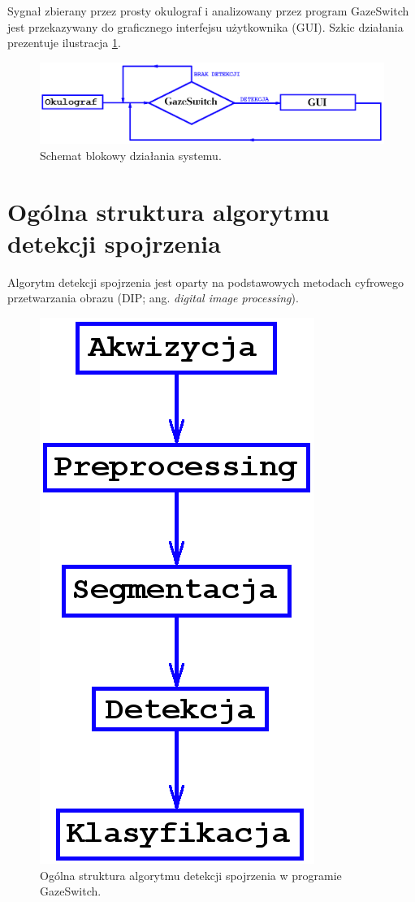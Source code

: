 \newpage
Sygnał zbierany przez prosty okulograf i analizowany przez program GazeSwitch jest przekazywany do graficznego interfejsu użytkownika (GUI). Szkic działania prezentuje ilustracja \ref{fig2}.
\begin{figure}[!h]
\centering
\includegraphics[scale=0.3]{images/2.png}
\caption{Schemat blokowy działania systemu. \label{fig2}}
\end{figure}

\section{Ogólna struktura algorytmu detekcji spojrzenia}
Algorytm detekcji spojrzenia jest oparty na podstawowych metodach cyfrowego przetwarzania obrazu (DIP; ang. \textit{digital image processing}).

\begin{figure}
  \vspace{-0.3cm}
  \begin{center}
    \includegraphics[scale=0.3]{images/3.png}
  \end{center}
  \caption{Ogólna struktura algorytmu detekcji spojrzenia w programie GazeSwitch. \label{fig3}}
\end{figure}

